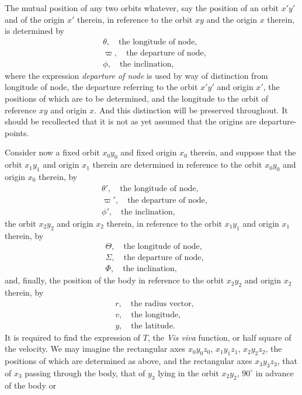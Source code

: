 \documentclass[12pt,a4paper]{article}
\theoremstyle{plain}
\begin{document}
\newpage
{} The mutual position of any two orbits whatever, say the position of an orbit $x'y'$ and of the origin $x'$ therein, in reference to the orbit $xy$ and the origin $x$ therein, is determined by
\begin{align*}
&\theta,\quad \text{the longitude of node},\\
&\varpi,\quad \text{the departure of node},\\
&\phi,\quad \text{the inclination},
\end{align*}
where the expression \textit{departure of node} is used by way of distinction from longitude of node, the departure referring to the orbit $x'y'$ and origin $x'$, the positions of which are to be determined, and the longitude to the orbit of reference $xy$ and origin $x$. And this distinction will be preserved throughout. It should be recollected that it is not as yet assumed that the origins are departure-points.

\medskip
Consider now a fixed orbit $x_{0}y_{0}$ and fixed origin $x_{0}$ therein, and suppose that the orbit $x_{1}y_{1}$ and origin $x_{1}$ therein are determined in reference to the orbit $x_{0}y_{0}$ and origin $x_{0}$ therein, by
\begin{align*}
&\theta',\quad \text{the longitude of node},\\
&\varpi',\quad \text{the departure of node},\\
&\phi',\quad \text{the inclination},
\end{align*}
the orbit $x_{2}y_{2}$ and origin $x_{2}$ therein, in reference to the orbit $x_{1}y_{1}$ and origin $x_{1}$ therein, by
\begin{align*}
&\Theta,\quad \text{the longitude of node},\\
&\varSigma,\quad \text{the departure of node},\\
&\varPhi,\quad \text{the inclination},
\end{align*}
and, finally, the position of the body in reference to the orbit $x_{2}y_{2}$ and origin $x_{2}$ therein, by
\begin{align*}
&r,\quad \text{the radius vector},\\
&v,\quad \text{the longitude},\\
&y,\quad \text{the latitude}.
\end{align*}
It is required to find the expression of $T$, the \textit{Vis viva} function, or half square of the velocity. We may imagine the rectangular axes $x_{0}y_{0}z_{0}$, $x_{1}y_{1}z_{1}$, $x_{2}y_{2}z_{2}$, the positions of which are determined as above, and the rectangular axes $x_{3}y_{3}z_{3}$, that of $x_{3}$ passing through the body, that of $y_{3}$ lying in the orbit $x_{2}y_{2}$, $90^{\circ}$ in advance of the body or
\end{document}
